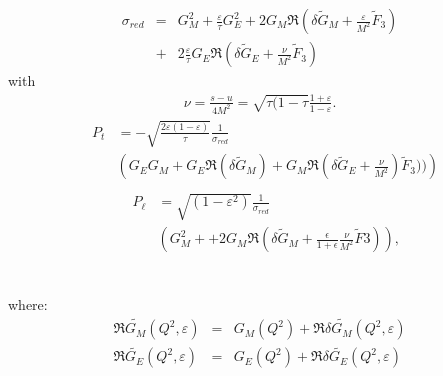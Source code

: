 \begin{eqnarray}
\sigma_{red}&=& G_M^2 + \frac{\varepsilon}{\tau}G_E^2 + 2 G_M\Re\left(\delta \tilde{G}_M + \frac{\varepsilon}{M^2} \tilde F_3\right) 
\nonumber \\
&+& 2\frac{\varepsilon}{\tau} G_E \Re \left(\delta\tilde G_E + \frac{\nu}{M^2}\tilde F_3\right)
\label{eq:siggen}
\end{eqnarray}
\vspace{-0.25in}
\noindent with 
\begin{eqnarray}
\nu=\frac{s-u}{4M^2}=\sqrt{\tau(1-\tau}\frac{1+\varepsilon}{1-\varepsilon}.
\label{eq:nu2gamma}
\end{eqnarray}
\vspace{-0.25in}
\begin{eqnarray}
&P_t&=-\sqrt{\frac{2\varepsilon(1-\varepsilon)}{\tau}} \frac{1}{\sigma _{red}}  \nonumber \\
& &\left(G_E G_M + G_E\Re(\delta \tilde{G}_M) + G_M\Re(\delta \tilde{G}_E+\frac{\nu}{M^2}) \tilde F_3))\right)\nonumber\\
\label{eq:ptgen}
\end{eqnarray}
\vspace{-0.5in}
\begin{eqnarray}
&P_{\ell}&=\sqrt{(1-\varepsilon ^2)}\frac{1}{\sigma _{red}} \nonumber \\
& &\left(G_M^2 + +2 G_M \Re(\delta \tilde G_M+\frac{\epsilon}{1+\epsilon}\frac{\nu}{M^2}\tilde F3)\right)
\label{eq:plgen}
\mbox{,}
\end{eqnarray}
\vspace{-0.25in}
\\
\\
where:
\begin{eqnarray}
\Re\tilde{G_M}(Q^2,\varepsilon)&=&G_M(Q^2)+\Re\delta \tilde{G_M}(Q^2,\varepsilon)  \\ 
\label{eq:regm}
\Re\tilde{G_E}(Q^2,\varepsilon)&=&G_E(Q^2)+\Re\delta \tilde{G_E}(Q^2, \varepsilon) 
\label{eq:rege} 
\end{eqnarray}

